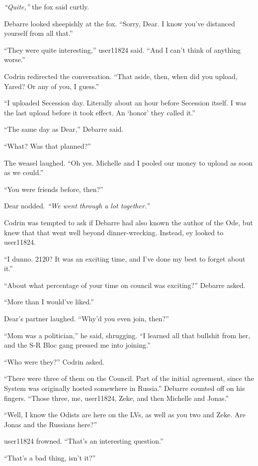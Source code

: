 \emph{``Quite,''} the fox said curtly.

Debarre looked sheepishly at the fox. ``Sorry, Dear. I know you've distanced yourself from all that.''

``They were quite interesting,'' user11824 said. ``And I can't think of anything worse.''

Codrin redirected the conversation. ``That aside, then, when did you upload, Yared? Or any of you, I guess.''

``I uploaded Secession day. Literally about an hour before Secession itself. I was the last upload before it took effect. An `honor' they called it.''

``The same day as Dear,'' Debarre said.

``What? Was that planned?''

The weasel laughed. ``Oh yes. Michelle and I pooled our money to upload as soon as we could.''

``You were friends before, then?''

Dear nodded. \emph{``We went through a lot together.''}

Codrin was tempted to ask if Debarre had also known the author of the Ode, but knew that that went well beyond dinner-wrecking. Instead, ey looked to user11824.

``I dunno. 2120? It was an exciting time, and I've done my best to forget about it.''

``About what percentage of your time on council was exciting?'' Debarre asked.

``More than I would've liked.''

Dear's partner laughed. ``Why'd you even join, then?''

``Mom was a politician,'' he said, shrugging. ``I learned all that bullshit from her, and the S-R Bloc gang pressed me into joining.''

``Who were they?'' Codrin asked.

``There were three of them on the Council. Part of the initial agreement, since the System was originally hosted somewhere in Russia.'' Debarre counted off on his fingers. ``Those three, me, user11824, Zeke, and then Michelle and Jonas.''

``Well, I know the Odists are here on the LVs, as well as you two and Zeke. Are Jonas and the Russians here?''

user11824 frowned. ``That's an interesting question.''

``That's a bad thing, isn't it?''


